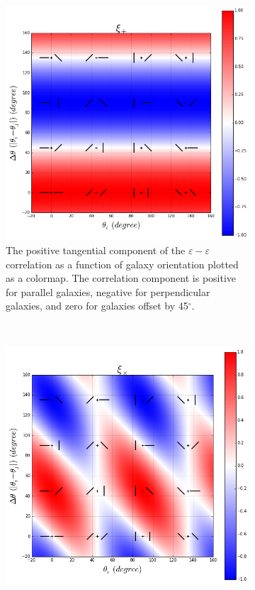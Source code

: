 \documentclass[%
 reprint,
 amsmath,amssymb,
 aps,nofootinbib
]{revtex4-1}
\begin{document}
\begin{figure}[!b]
    \centering
    \begin{subfigure}{0.425\textwidth}
        \includegraphics[width=\textwidth]{figs-swe/xip_colormap.png}
        \captionsetup{justification=raggedright,singlelinecheck=false}
        \caption{The positive tangential component of the $\varepsilon-\varepsilon$ correlation as a function of galaxy orientation plotted as a colormap. The correlation component is positive for parallel galaxies, negative for perpendicular galaxies, and zero for galaxies offset by 45$^\circ$.}
        \label{xip_colormap}
    \end{subfigure}
    ~
    \begin{subfigure}{0.425\textwidth}
        \includegraphics[width=\textwidth]{figs-swe/xix_colormap.png}

\end{subfigure}
\end{figure}
\end{document}
